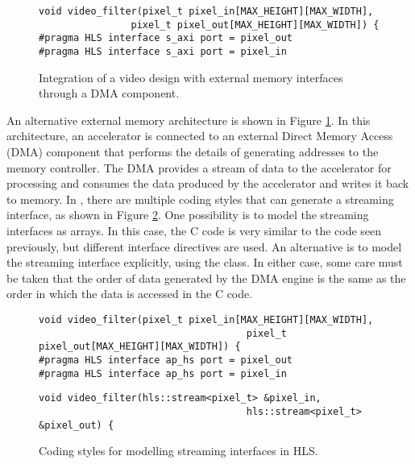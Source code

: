\begin{figure}
\centering
\framebox{{\tiny }}
\begin{scriptsize}
\begin{lstlisting}
void video_filter(pixel_t pixel_in[MAX_HEIGHT][MAX_WIDTH],
				pixel_t pixel_out[MAX_HEIGHT][MAX_WIDTH]) {
#pragma HLS interface s_axi port = pixel_out
#pragma HLS interface s_axi port = pixel_in
\end{lstlisting}
\end{scriptsize}
\caption{Integration of a video design with external memory interfaces through a DMA component.}\label{fig:video:DDR_DMA_interface}
\end{figure}

An alternative external memory architecture is shown in Figure \ref{fig:video:DDR_DMA_interface}.  In this architecture, an accelerator is connected to an external Direct Memory Access (DMA) component that performs the details of generating addresses to the memory controller.  The DMA provides a stream of data to the accelerator for processing and consumes the data produced by the accelerator and writes it back to memory.  In \VHLS, there are multiple coding styles that can generate a streaming interface, as shown in Figure \ref{fig:video:stream_interfaces}.  One possibility is to model the streaming interfaces as arrays.  In this case, the C code is very similar to the code seen previously, but different interface directives are used.  An alternative is to model the streaming interface explicitly, using the  class.  In either case, some care must be taken that the order of data generated by the DMA engine is the same as the order in which the data is accessed in the C code.

\begin{figure}
\centering
\begin{scriptsize}
\begin{lstlisting}
void video_filter(pixel_t pixel_in[MAX_HEIGHT][MAX_WIDTH],
									pixel_t pixel_out[MAX_HEIGHT][MAX_WIDTH]) {
#pragma HLS interface ap_hs port = pixel_out
#pragma HLS interface ap_hs port = pixel_in
\end{lstlisting}
\begin{lstlisting}
void video_filter(hls::stream<pixel_t> &pixel_in,
									hls::stream<pixel_t> &pixel_out) {
\end{lstlisting}
\end{scriptsize}

\caption{Coding styles for modelling streaming interfaces in HLS.}\label{fig:video:stream_interfaces}
\end{figure}

